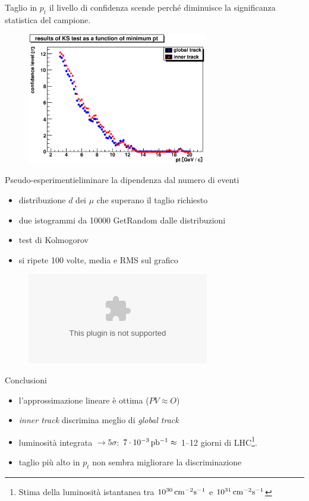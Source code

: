 \documentclass[italian]{beamer}
\begin{document}
\begin{frame}{Taglio in $p_t$}
    il livello di confidenza scende perch\'e diminuisce la significanza
    statistica del campione.
\begin{figure}[h]
    \includegraphics[width=0.7\textwidth]{crea_istogrammi/pt_1.eps}
\end{figure}
\end{frame}
\begin{frame}{Pseudo-esperimenti}{eliminare la dipendenza dal numero di
    eventi}
    \begin{itemize}
        \item<+-> distribuzione $d$ dei $\mu$ che superano il taglio richiesto
        \item<+-> due istogrammi da 10000 GetRandom dalle distribuzioni
        \item<+-> test di Kolmogorov
        \item<+-> si ripete 100 volte, media e RMS sul grafico 
    \end{itemize}
\begin{figure}[h]
    \includegraphics<+->[height=0.6\textheight]{crea_istogrammi/pseudo_pt_1.eps}
\end{figure}
\end{frame}

\begin{frame}{Conclusioni} 
    \begin{itemize}
        \item l'approssimazione lineare è ottima ($PV \approx O$)
        \item \emph{inner track} discrimina meglio di \emph{global track}
        \item luminosità integrata $\to 5\sigma$: $\unit[7\cdot
            10^{-3}]{pb^{-1}} \approx$ 1--12 giorni di
            LHC\footnote{Stima della luminosità istantanea tra
            $\unit[10^{30}]{cm^{-2}s^{-1}}$ e $\unit[10^{31}]{cm^{-2}s^{-1}}$}. 
        \item taglio più alto in $p_t$ non sembra migliorare la discriminazione
    \end{itemize}
\end{frame}
\end{document}
